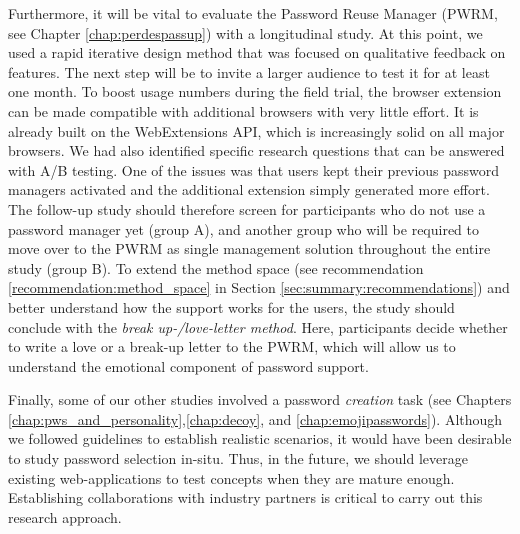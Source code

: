 Furthermore, it will be vital to evaluate the Password Reuse Manager (PWRM, see Chapter \ref{chap:perdespassup}) with a longitudinal study. At this point, we used a rapid iterative design method that was focused on qualitative feedback on features. The next step will be to invite a larger audience to test it for at least one month. To boost usage numbers during the field trial, the browser extension can be made compatible with additional browsers with very little effort. It is already built on the WebExtensions API, which is increasingly solid on all major browsers. We had also identified specific research questions that can be answered with A/B testing. One of the issues was that users kept their previous password managers activated and the additional extension simply generated more effort. The follow-up study should therefore screen for participants who do not use a password manager yet (group A), and another group who will be required to move over to the PWRM as single management solution throughout the entire study (group B). To extend the method space (see recommendation \ref{recommendation:method_space} in Section \ref{sec:summary:recommendations}) and better understand how the support works for the users, the study should conclude with the \textit{break up-/love-letter method}. Here, participants decide whether to write a love or a break-up letter to the PWRM, which will allow us to understand the emotional component of password support. 

Finally, some of our other studies involved a password \textit{creation} task (see Chapters \ref{chap:pws_and_personality},\ref{chap:decoy}, and \ref{chap:emojipasswords}). Although we followed guidelines to establish realistic scenarios, it would have been desirable to study password selection in-situ. Thus, in the future, we should leverage existing web-applications to test concepts when they are mature enough. Establishing collaborations with industry partners is critical to carry out this research approach. 

